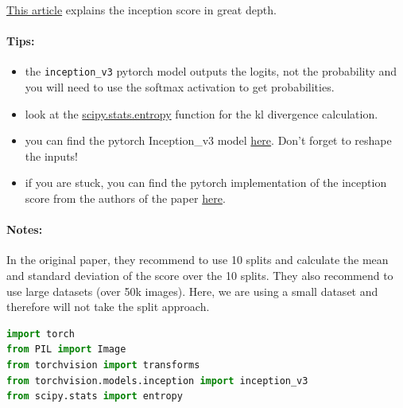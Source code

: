 \href{https://medium.com/octavian-ai/a-simple-explanation-of-the-inception-score-372dff6a8c7a}{This article} explains the inception score in great depth.

\paragraph{Tips:}

\begin{itemize}
\item the \lstinline{inception_v3} pytorch model outputs the logits, not the probability and you will need to use the softmax activation to get probabilities.
\item look at the \href{https://docs.scipy.org/doc/scipy/reference/generated/scipy.stats.entropy.html}{scipy.stats.entropy}
  function for the kl divergence calculation.
\item you can find the pytorch Inception\_v3 model \href{https://pytorch.org/hub/pytorch_vision_inception_v3/}{here}. Don't forget to reshape the inputs!
\item if you are stuck, you can find the pytorch implementation of the inception score from the authors of the paper \href{https://github.com/openai/improved-gan/blob/master/inception_score/model.py}{here}.
\end{itemize}

\paragraph{Notes:}
In the original paper, they recommend to use 10 splits and calculate the mean and standard deviation of the score over the 10 splits. They also recommend to use large datasets (over 50k images). Here, we are using a small dataset and therefore will not take the split approach.

\begin{lstlisting}[language=Python]
import torch
from PIL import Image
from torchvision import transforms
from torchvision.models.inception import inception_v3
from scipy.stats import entropy
\end{lstlisting}

